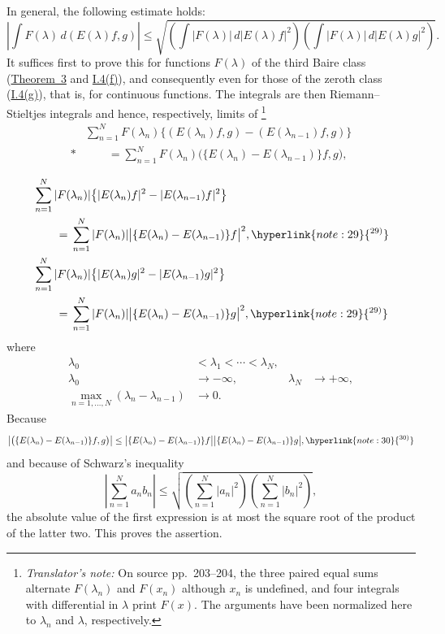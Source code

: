 \documentclass[12pt,b5paper,twoside]{article}
\newcommand{\noteref}[1]{%
  \hyperlink{note:#1}{\textsuperscript{#1)}}}
\newcommand{\translatorfootnote}[2]{%
  \begingroup
  \renewcommand{\thefootnote}{#1}%
  \footnote{\hspace{0.8em}\textit{Translator's note:} #2}%
  \endgroup}
\begin{document}
In general, the following estimate holds:
\[
 \left|\int F(\lambda)\,d(E(\lambda)f,g)\right|
 \leq
 \sqrt{
   \left(\int |F(\lambda)|\,d|E(\lambda)f|^2\right)
   \left(\int |F(\lambda)|\,d|E(\lambda)g|^2\right)}.
\]
It suffices first to prove this for functions \(F(\lambda)\) of the third
Baire class (\hyperref[thm:3]{Theorem~3} and
\hyperref[prop:I.4.f]{I.4(f)}), and consequently even for those of the zeroth
class (\hyperref[prop:I.4.g]{I.4(g)}), that is, for continuous functions.  The
integrals are then Riemann--Stieltjes integrals and hence, respectively,
limits of\translatorfootnote{T4}{On source pp.~203--204, the three paired equal sums alternate $F(\lambda_n)$ and $F(x_n)$ although $x_n$ is undefined, and four integrals with differential in $\lambda$ print $F(x)$. The arguments have been normalized here to $\lambda_n$ and $\lambda$, respectively.}
\begin{align*}
 &\sum_{n=1}^{N} F(\lambda_n)
 \bigl\{(E(\lambda_n)f,g)-(E(\lambda_{n-1})f,g)\bigr\} \\*
 &\qquad={}
 \sum_{n=1}^{N}F(\lambda_n)
 \bigl(\{E(\lambda_n)-E(\lambda_{n-1})\}f,g\bigr),
\end{align*}

\begin{align*}
 &\sum_{n=1}^{N}|F(\lambda_n)|
 \bigl\{|E(\lambda_n)f|^2-|E(\lambda_{n-1})f|^2\bigr\} \\*
 &\qquad={}
 \sum_{n=1}^{N}|F(\lambda_n)|
 \bigl|\{E(\lambda_n)-E(\lambda_{n-1})\}f\bigr|^2,\noteref{29}\\
 &\sum_{n=1}^{N}|F(\lambda_n)|
 \bigl\{|E(\lambda_n)g|^2-|E(\lambda_{n-1})g|^2\bigr\} \\*
 &\qquad={}
 \sum_{n=1}^{N}|F(\lambda_n)|
 \bigl|\{E(\lambda_n)-E(\lambda_{n-1})\}g\bigr|^2,\noteref{29}
\end{align*}
where
\begin{align*}
 \lambda_0&<\lambda_1<\cdots<\lambda_N,\\
 \lambda_0&\longrightarrow-\infty,
 &\lambda_N&\longrightarrow+\infty,\\
 \max_{n=1,\ldots,N}(\lambda_n-\lambda_{n-1})&\longrightarrow0.
\end{align*}
Because
\[
 \left|\bigl(\{E(\lambda_n)-E(\lambda_{n-1})\}f,g\bigr)\right|
 \leq
 \bigl|\{E(\lambda_n)-E(\lambda_{n-1})\}f\bigr|
 \bigl|\{E(\lambda_n)-E(\lambda_{n-1})\}g\bigr|,\noteref{30}
\]
and because of Schwarz's inequality
\[
 \left|\sum_{n=1}^{N}a_nb_n\right|
 \leq
 \sqrt{\left(\sum_{n=1}^{N}|a_n|^2\right)
       \left(\sum_{n=1}^{N}|b_n|^2\right)},
\]
the absolute value of the first expression is at most the square root of
the product of the latter two.  This proves the assertion.
\end{document}

